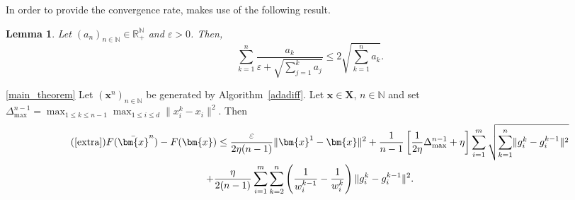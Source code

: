 \documentclass[11pt]{article}
\theoremstyle{plain}
\newtheorem{proposition}[theorem]{Proposition}
\newtheorem{lemma}[theorem]{Lemma}
\theoremstyle{definition}
\theoremstyle{remark}
\newcommand{\norm}[1]{\lVert{#1}\rVert}
\newcommand{\HH}{X}
\newcommand{\bHH}{\bm{X}}
\newcommand{\R}{\mathbb{R}}
\newcommand{\x}{x}
\newcommand{\m}{d}
\newcommand{\bx}{\bm{x}}
\newcommand{\uu}{g}
\newcommand{\w}{w}
\newcommand{\iter}{n}
\newcommand{\ite}{k}
\newcommand{\N}{\mathbb{N}}
\begin{document}
\noindent
In order to provide the convergence rate, \citet{duchi2011adaptive} makes use of the following result.
\begin{lemma}\label{lemma2}
Let $(a_\iter)_{\iter\in \N}\in \R_+^\N$ and $\varepsilon > 0$. Then,
\begin{equation*}
    \sum_{\ite=1}^{\iter} \frac{a_\ite}{\varepsilon +\sqrt{ \sum_{j=1}^{\ite} a_j}} \le 2\sqrt{\sum_{\ite=1}^{\iter} a_\ite}.
\end{equation*}
\end{lemma}

\begin{customprop}{\ref{main_theorem}}
Let $(\bx^\iter)_{\iter\in \N}$ be generated by Algorithm~\ref{adadiff}. Let $\bx\in \bHH$, $\iter \in \N$ and set
$\Delta^{\iter-1}_{\max} = \max_{1\leq \ite\leq \iter-1} \max_{1\leq i\leq \m} \norm{\x^\ite_i - x_i}^2$.
Then
\begin{multline}
\tag{\ref{extra}}
 F(\bar{\bx}^{\iter}) - F(\bx)  \le \frac{\varepsilon}{2\eta(\iter-1)}\lVert \bx^1 - \bx\rVert^2
+\frac{1}{\iter-1}\left[\frac{1}{2\eta}\Delta^{\iter-1}_{\max} + \eta \right]\sum_{i=1}^m \sqrt{\sum_{\ite=1}^{\iter} \norm{\uu_i^\ite - \uu_{i}^{\ite-1}}^2} \\
+ \frac{\eta}{2(\iter-1)} \sum_{i=1}^m\sum_{\ite=2}^{\iter} \left(\frac{1}{\w_i^{\ite-1}} - \frac{1}{\w_i^\ite}\right)\norm{\uu_i^\ite - \uu_i^{\ite-1}}^2.
\end{multline}
\end{customprop}
\end{document}
